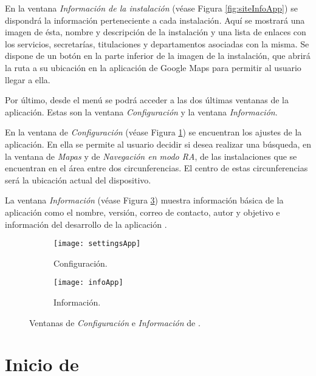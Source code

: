 En la ventana \textit{Información de la instalación} (véase Figura \ref{fig:siteInfoApp}) se dispondrá la información perteneciente a cada instalación. Aquí se  mostrará una imagen de ésta, nombre y descripción de la instalación y una lista de enlaces con los servicios, secretarías, titulaciones y departamentos asociadas con la misma. 
Se dispone de un botón en la parte inferior de la imagen de la instalación, que  abrirá la ruta a su ubicación en la aplicación de Google Maps para permitir al usuario llegar a ella.  

Por último, desde el menú se podrá acceder a las dos últimas ventanas de la aplicación. Estas son la ventana \textit{Configuración} y la ventana \textit{Información}.

En la ventana de \textit{Configuración} (véase Figura \ref{fig:settingsApp}) se encuentran los ajustes de la aplicación. En ella se permite al usuario decidir si desea realizar una búsqueda, en la ventana de \textit{Mapas} y de \textit{Navegación en modo RA}, de las instalaciones que se encuentran en el área entre dos circunferencias. El centro de estas circunferencias será la ubicación actual del dispositivo.

La ventana \textit{Información} (véase Figura \ref{fig:infoApp})  muestra información básica de la aplicación como el nombre, versión, correo de contacto, autor y objetivo e información del desarrollo de la aplicación \textit{\ULLAR{}}.  

\begin{figure}[h]
    \hspace*{\fill}%
    \begin{subfigure}[h]{0.35\linewidth}
    \texttt{[image: settingsApp]}
    \caption{Configuración.}
    \label{fig:settingsApp}
    \end{subfigure}
    \hfill%
    \begin{subfigure}[h]{0.35\linewidth}
    \texttt{[image: infoApp]}
    \caption{Información.}
    \label{fig:infoApp}
    \end{subfigure}%
    \caption{Ventanas de \textit{Configuración} e \textit{Información} de \textit{\ULLAR{}}.}
    \hspace*{\fill}%
\end{figure}

\vskip 1.9in

\section{Inicio de \ULLAR{}} \label{chap:StartApplication} 

